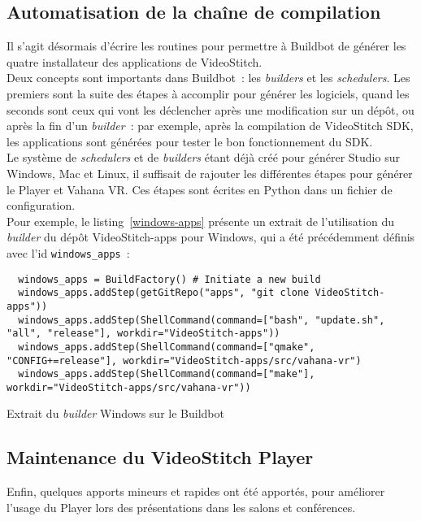 \subsection{Automatisation de la chaîne de compilation}
Il s'agit désormais d'écrire les routines pour permettre à Buildbot de générer
les quatre installateur des applications de VideoStitch.\\
Deux concepts sont importants dans Buildbot~: les \textit{builders} et les \textit{schedulers}.
Les premiers sont la suite des étapes à accomplir pour générer les logiciels, quand
les seconds sont ceux qui vont les déclencher après une modification
sur un dépôt, ou après la fin d'un \textit{builder}~: par exemple, après la compilation de
VideoStitch SDK, les applications sont générées pour tester le bon fonctionnement
du SDK.\\
Le système de \textit{schedulers} et de \textit{builders} étant déjà créé pour 
générer Studio sur Windows, Mac et Linux, il suffisait de rajouter les différentes 
étapes pour générer le Player et Vahana VR. Ces étapes sont écrites en Python dans un fichier de configuration.
\ \\
\newline
Pour exemple, le listing~\ref{windows-apps} présente un extrait de l'utilisation 
du \textit{builder} du dépôt VideoStitch-apps pour Windows, qui a été précédemment 
définis avec l'id \texttt{windows_apps}~:
\begin{listing}
  \begin{verbatim}
  windows_apps = BuildFactory() # Initiate a new build
  windows_apps.addStep(getGitRepo("apps", "git clone VideoStitch-apps"))
  windows_apps.addStep(ShellCommand(command=["bash", "update.sh", "all", "release"], workdir="VideoStitch-apps"))
  windows_apps.addStep(ShellCommand(command=["qmake", "CONFIG+=release"], workdir="VideoStitch-apps/src/vahana-vr")
  windows_apps.addStep(ShellCommand(command=["make"], workdir="VideoStitch-apps/src/vahana-vr"))
  \end{verbatim}
  \caption{Extrait du \textit{builder} Windows sur le Buildbot}
  \label{windows-apps}
\end{listing}

\subsection{Maintenance du VideoStitch Player}
Enfin, quelques apports mineurs et rapides ont été apportés, pour améliorer l'usage
du Player lors des présentations dans les salons et conférences.
